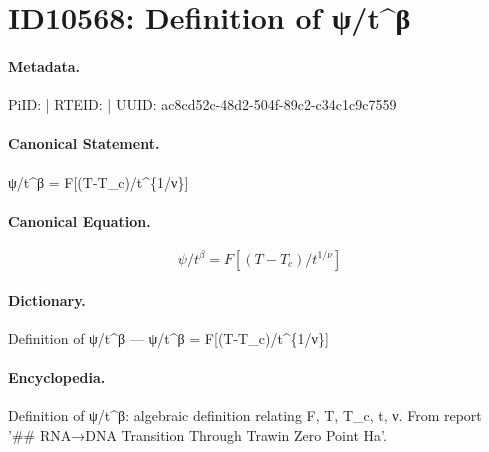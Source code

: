 \section*{ID10568: Definition of ψ/t\textasciicircum{}β}
\paragraph{Metadata.}
PiID:  | RTEID:  | UUID: ac8cd52c-48d2-504f-89c2-c34c1c9c7559

\paragraph{Canonical Statement.}
ψ/t\textasciicircum{}β = F[(T-T\_c)/t\textasciicircum{}\{1/ν\}]

\paragraph{Canonical Equation.}
\[
ψ/t^β = F[(T-T_c)/t^{1/ν}]
\]

\paragraph{Dictionary.}
Definition of ψ/t\textasciicircum{}β — ψ/t\textasciicircum{}β = F[(T-T\_c)/t\textasciicircum{}\{1/ν\}]

\paragraph{Encyclopedia.}
Definition of ψ/t\textasciicircum{}β: algebraic definition relating F, T, T\_c, t, ν. From report '\#\# RNA→DNA Transition Through Trawin Zero Point Ha'.

